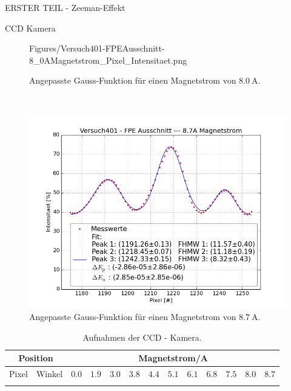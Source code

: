 \begin{appendix}
\begin{chapter}{ERSTER TEIL - Zeeman-Effekt}
\begin{section}{CCD Kamera}
\begin{figure}[htbp!]
\begin{minipage}{0.48\textwidth}
        {Figures/Versuch401-FPEAusschnitt-8_0AMagnetstrom_Pixel_Intensitaet.png}
          \caption{Angepasste Gauss-Funktion für einen Magnetstrom von 
              $\SI{8.0}{\ampere}$.}
          \label{fig:AnhangZM80}
        \end{minipage} \\
        \begin{minipage}{0.48\textwidth}
          \centering
          \includegraphics[width=\textwidth]
        {Figures/Versuch401-FPEAusschnitt-8_7AMagnetstrom_Pixel_Intensitaet.png}
          \caption{Angepasste Gauss-Funktion für einen Magnetstrom von 
              $\SI{8.7}{\ampere}$.}
          \label{fig:AnhangZM87}
        \end{minipage}
      \end{figure}
      
      \begin{scriptsize}
        \begin{longtable}[htbp]{|c|c|c|c|c|c|c|c|c|c|c|c|c|}
          \hline
          \multicolumn{2}{|c|}{Position} &\multicolumn{11}{|c|}{Magnetstrom/A}\\
          \hline
          Pixel & Winkel & $0.0$ & $1.9$ & $3.0$ & $3.8$ & $4.4$ & $5.1$ & 
              $6.1$ & $6.8$ & $7.5$ & $8.0$ & $8.7$ \\ \hline\hline \endhead
          
          \caption{Aufnahmen der CCD - Kamera.}
          \label{tab:CCD}
        \end{longtable}
      \end{scriptsize}
      
    \end{section}
    

\end{chapter}
\end{appendix}
